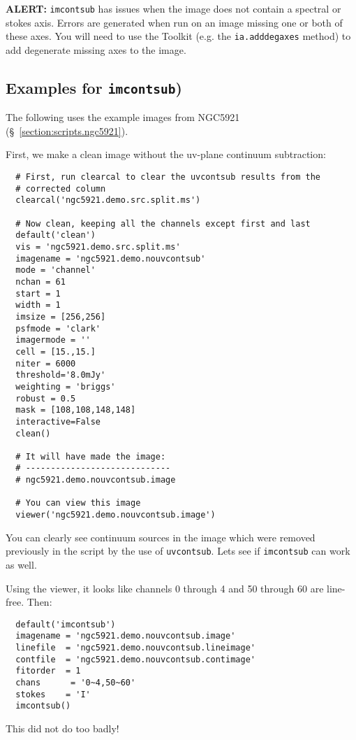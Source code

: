 {\bf ALERT:} {\tt imcontsub} has issues when the image does
not contain a spectral or stokes axis. Errors are generated when
run on an image missing one or both of these axes.  You will need
to use the Toolkit (e.g. the {\tt ia.adddegaxes} method) to add
degenerate missing axes to the image.

\subsection{Examples for {\tt imcontsub})}
\label{section:analysis.imcontsub.examples}

The following uses the example images from NGC5921
(\S~\ref{section:scripts.ngc5921}).

First, we make a clean image without the uv-plane continuum
subtraction:
\small
\begin{verbatim}
  # First, run clearcal to clear the uvcontsub results from the
  # corrected column
  clearcal('ngc5921.demo.src.split.ms')
  
  # Now clean, keeping all the channels except first and last
  default('clean')
  vis = 'ngc5921.demo.src.split.ms'
  imagename = 'ngc5921.demo.nouvcontsub'
  mode = 'channel'
  nchan = 61
  start = 1
  width = 1
  imsize = [256,256]
  psfmode = 'clark'
  imagermode = ''
  cell = [15.,15.]
  niter = 6000
  threshold='8.0mJy'
  weighting = 'briggs'
  robust = 0.5
  mask = [108,108,148,148]
  interactive=False
  clean()
  
  # It will have made the image:
  # -----------------------------
  # ngc5921.demo.nouvcontsub.image

  # You can view this image
  viewer('ngc5921.demo.nouvcontsub.image')
\end{verbatim}
\normalsize
You can clearly see continuum sources in the image which were removed
previously in the script by the use of {\tt uvcontsub}.  Lets see
if {\tt imcontsub} can work as well.

Using the viewer, it looks like channels 0 through 4 and
50 through 60 are line-free.  Then:
\small
\begin{verbatim}
  default('imcontsub')
  imagename = 'ngc5921.demo.nouvcontsub.image'
  linefile  = 'ngc5921.demo.nouvcontsub.lineimage'
  contfile  = 'ngc5921.demo.nouvcontsub.contimage'
  fitorder  = 1
  chans      = '0~4,50~60'
  stokes    = 'I'
  imcontsub()
\end{verbatim}
\normalsize
This did not do too badly!

